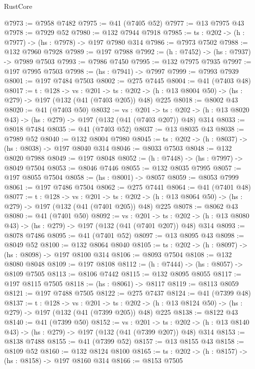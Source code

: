 \begin{lexlean}{RustCore}
\begin{coremodule}
@7973 := @7958 @7482
@7975 := @41 (@7405 @52)
@7977 := @13 @7975 @43
@7978 := @7929 @52
@7980 := @132 @7944 @7918
@7985 := {ts : @202} -> (h : @7977) -> (hs : @7978) -> @197 @7980 @314
@7986 := @7973 @7502
@7988 := @132 @7960 @7928
@7989 := @197 @7988
@7992 := (h : @7452) -> (hs : @7937) -> @7989 @7503
@7993 := @7986 @7450
@7995 := @132 @7975 @7935
@7997 := @197 @7995 @7503
@7998 := (hs : @7941) -> @7997
@7999 := @7993 @7939
@8001 := @197 @7484 @7503
@8002 := @275 @7445
@8004 := @41 (@7403 @48)
@8017 := {t : @128} ->
  {vs : @201} ->
  {ts : @202} -> (h : @13 @8004 @50) -> (hs : @279) -> @197 (@132 (@41 (@7403 @205)) @48) @225
@8018 := @8002 @43
@8020 := @41 (@7403 @50)
@8032 := {vs : @201} ->
  {ts : @202} -> (h : @13 @8020 @43) -> (hs : @279) -> @197 (@132 (@41 (@7403 @207)) @48) @314
@8033 := @8018 @7484
@8035 := @41 (@7403 @52)
@8037 := @13 @8035 @43
@8038 := @7989 @52
@8040 := @132 @8004 @7980
@8045 := {ts : @202} -> (h : @8037) -> (hs : @8038) -> @197 @8040 @314
@8046 := @8033 @7503
@8048 := @132 @8020 @7988
@8049 := @197 @8048
@8052 := (h : @7448) -> (hs : @7997) -> @8049 @7504
@8053 := @8046 @7446
@8055 := @132 @8035 @7995
@8057 := @197 @8055 @7504
@8058 := (hs : @8001) -> @8057
@8059 := @8053 @7999
@8061 := @197 @7486 @7504
@8062 := @275 @7441
@8064 := @41 (@7401 @48)
@8077 := {t : @128} ->
  {vs : @201} ->
  {ts : @202} -> (h : @13 @8064 @50) -> (hs : @279) -> @197 (@132 (@41 (@7401 @205)) @48) @225
@8078 := @8062 @43
@8080 := @41 (@7401 @50)
@8092 := {vs : @201} ->
  {ts : @202} -> (h : @13 @8080 @43) -> (hs : @279) -> @197 (@132 (@41 (@7401 @207)) @48) @314
@8093 := @8078 @7486
@8095 := @41 (@7401 @52)
@8097 := @13 @8095 @43
@8098 := @8049 @52
@8100 := @132 @8064 @8040
@8105 := {ts : @202} -> (h : @8097) -> (hs : @8098) -> @197 @8100 @314
@8106 := @8093 @7504
@8108 := @132 @8080 @8048
@8109 := @197 @8108
@8112 := (h : @7444) -> (hs : @8057) -> @8109 @7505
@8113 := @8106 @7442
@8115 := @132 @8095 @8055
@8117 := @197 @8115 @7505
@8118 := (hs : @8061) -> @8117
@8119 := @8113 @8059
@8121 := @197 @7488 @7505
@8122 := @275 @7437
@8124 := @41 (@7399 @48)
@8137 := {t : @128} ->
  {vs : @201} ->
  {ts : @202} -> (h : @13 @8124 @50) -> (hs : @279) -> @197 (@132 (@41 (@7399 @205)) @48) @225
@8138 := @8122 @43
@8140 := @41 (@7399 @50)
@8152 := {vs : @201} ->
  {ts : @202} -> (h : @13 @8140 @43) -> (hs : @279) -> @197 (@132 (@41 (@7399 @207)) @48) @314
@8153 := @8138 @7488
@8155 := @41 (@7399 @52)
@8157 := @13 @8155 @43
@8158 := @8109 @52
@8160 := @132 @8124 @8100
@8165 := {ts : @202} -> (h : @8157) -> (hs : @8158) -> @197 @8160 @314
@8166 := @8153 @7505

\end{coremodule}
\end{lexlean}
